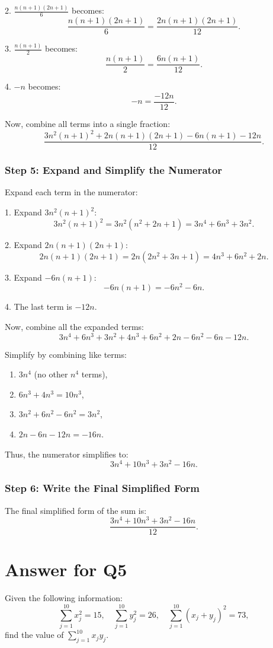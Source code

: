\documentclass{article}
\begin{document}
2. \(\frac{n(n+1)(2n+1)}{6}\) becomes:
   \[
   \frac{n(n+1)(2n+1)}{6} = \frac{2n(n+1)(2n+1)}{12}.
   \]

3. \(\frac{n(n+1)}{2}\) becomes:
   \[
   \frac{n(n+1)}{2} = \frac{6n(n+1)}{12}.
   \]

4. \(-n\) becomes:
   \[
   -n = \frac{-12n}{12}.
   \]

Now, combine all terms into a single fraction:
\[
\frac{3n^2(n+1)^2 + 2n(n+1)(2n+1) - 6n(n+1) - 12n}{12}.
\]

\subsubsection*{Step 5: Expand and Simplify the Numerator}
Expand each term in the numerator:

1. Expand \(3n^2(n+1)^2\):
   \[
   3n^2(n+1)^2 = 3n^2(n^2 + 2n + 1) = 3n^4 + 6n^3 + 3n^2.
   \]

2. Expand \(2n(n+1)(2n+1)\):
   \[
   2n(n+1)(2n+1) = 2n(2n^2 + 3n + 1) = 4n^3 + 6n^2 + 2n.
   \]

3. Expand \(-6n(n+1)\):
   \[
   -6n(n+1) = -6n^2 - 6n.
   \]

4. The last term is \(-12n\).

Now, combine all the expanded terms:
\[
3n^4 + 6n^3 + 3n^2 + 4n^3 + 6n^2 + 2n - 6n^2 - 6n - 12n.
\]

Simplify by combining like terms:
\begin{enumerate}
    \item \(3n^4\) (no other \(n^4\) terms),
    \item \(6n^3 + 4n^3 = 10n^3\),
    \item \(3n^2 + 6n^2 - 6n^2 = 3n^2\),
    \item \(2n - 6n - 12n = -16n\).
\end{enumerate}


Thus, the numerator simplifies to:
\[
3n^4 + 10n^3 + 3n^2 - 16n.
\]

\subsubsection*{Step 6: Write the Final Simplified Form}
The final simplified form of the sum is:
\[
\boxed{\frac{3n^4 + 10n^3 + 3n^2 - 16n}{12}}.
\]
\section{Answer for Q5}
Given the following information:
\[
\sum_{j=1}^{10} x_j^2 = 15, \quad \sum_{j=1}^{10} y_j^2 = 26, \quad \sum_{j=1}^{10} (x_j + y_j)^2 = 73,
\]
find the value of \(\sum_{j=1}^{10} x_j y_j\).\\
\end{document}
